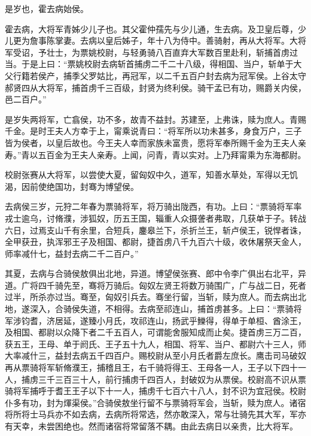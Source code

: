 \documentclass[12pt,UTF8]{ctexbook}
\begin{document}
是岁也，霍去病始侯。



霍去病，大将军青姊少儿子也。其父霍仲孺先与少儿通，生去病。及卫皇后尊，少儿更为詹事陈掌妻。去病以皇后姊子，年十八为侍中。善骑射，再从大将军。大将军受诏，予壮士，为票姚校尉，与轻勇骑八百直弃大军数百里赴利，斩捕首虏过当。于是上曰：“票姚校尉去病斩首捕虏二千二十八级，得相国、当户，斩单于大父行籍若侯产，捕季父罗姑比，再冠军，以二千五百户封去病为冠军侯。上谷太守郝贤四从大将军，捕首虏千三百级，封贤为终利侯。骑干孟已有功，赐爵关内侯，邑二百户。”



是岁失两将军，亡翕侯，功不多，故青不益封。苏建至，上弗诛，赎为庶人。青赐千金。是时王夫人方幸于上，甯乘说青曰：“将军所以功未甚多，身食万户，三子皆为侯者，以皇后故也。今王夫人幸而家族未富贵，愿将军奉所赐千金为王夫人亲寿。”青以五百金为王夫人亲寿。上闻，问青，青以实对。上乃拜甯乘为东海都尉。



校尉张赛从大将军，以尝使大夏，留匈奴中久，道军，知善水草处，军得以无饥渴，因前使绝国功，封骞为博望侯。



去病侯三岁，元狩二年春为票骑将军，将万骑出陇西，有功。上曰：“票骑将军率戎士逾乌，讨脩濮，涉狐奴，历五王国，辎重人众摄詟者弗取，几获单于子。转战六日，过焉支山千有余里，合短兵，鏖皋兰下，杀折兰王，斩卢侯王，锐悍者诛，全甲获丑，执浑邪王子及相国、都尉，捷首虏八千九百六十级，收休屠祭天金人，师率减什七，益封去病二千二百户。”



其夏，去病与合骑侯敖俱出北地，异道。博望侯张赛、郎中令李广俱出右北平，异道。广将四千骑先至，骞将万骑后。匈奴左贤王将数万骑围广，广与战二日，死者过半，所杀亦过当。骞至，匈奴引兵去。骞坐行留，当斩，赎为庶人。而去病出北地，遂深入，合骑侯失道，不相得。去病至祁连山，捕首虏甚多。上曰：“票骑将军涉钧耆，济居延，遂臻小月氏，攻祁连山，扬武乎鱳得，得单于单桓、酋涂王，及相国、都尉以众降下者二千五百人，可谓能舍服知成而止矣。捷首虏三万二百，获五王，王母、单于阏氏、王子五十九人，相国、将军、当户、都尉六十三人，师大率减什三，益封去病五千四百户。赐校尉从至小月氏者爵左庶长。鹰击司马破奴再从票骑将军斩脩濮王，捕稽且王，右千骑将得王、王母各一人，王子以下四十一人，捕虏三千三百三十人，前行捕虏千四百人，封破奴为从票侯。校尉高不识从票骑将军捕呼于耆王王子以下十一人，捕虏千七百六十八人，封不识为宜冠侯。校尉仆多有功，封为煇渠侯。”合骑侯敖坐行留不与票骑将军会，当斩，赎为庶人。诸宿将所将士马兵亦不如去病，去病所将常选，然亦敢深入，常与壮骑先其大军，军亦有天幸，未尝困绝也。然而诸宿将常留落不耦。由此去病日以亲贵，比大将军。
\end{document}
